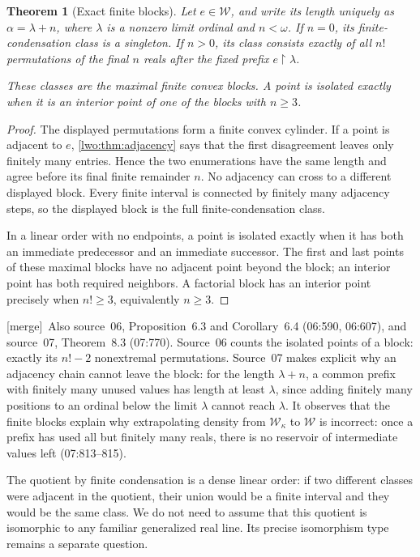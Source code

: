 \documentclass[11pt,a4paper]{article}
\newtheorem{theorem}{Theorem}[section]
\theoremstyle{definition}
\theoremstyle{remark}
\newcommand{\W}{\mathcal W}
\newcommand{\restr}{\mathbin{\upharpoonright}}
\newcommand{\merge}{\textsf{[merge]}}
\begin{document}
\begin{theorem}[Exact finite blocks]\label{lwo:thm:blocks}
Let $e\in\W$, and write its length uniquely as
$\alpha=\lambda+n$, where $\lambda$ is a nonzero limit ordinal and
$n<\omega$. If $n=0$, its finite-condensation class is a singleton. If
$n>0$, its class consists exactly of all $n!$ permutations of the final
$n$ reals after the fixed prefix $e\restr\lambda$.

These classes are the maximal finite convex blocks. A point is isolated
exactly when it is an interior point of one of the blocks with $n\geq3$.
\end{theorem}
\begin{proof}
The displayed permutations form a finite convex cylinder. If a point is
adjacent to $e$, \cref{lwo:thm:adjacency} says that the first disagreement
leaves only finitely many entries. Hence the two enumerations have the same
length and agree before its final finite remainder $n$. No adjacency can
cross to a different displayed block. Every finite interval is connected
by finitely many adjacency steps, so the displayed block is the full
finite-condensation class.

In a linear order with no endpoints, a point is isolated exactly when it
has both an immediate predecessor and an immediate successor. The first
and last points of these maximal blocks have no adjacent point beyond the
block; an interior point has both required neighbors. A factorial block has
an interior point precisely when $n!\geq3$, equivalently $n\geq3$.
\end{proof}
\merge\ Also source~06, Proposition~6.3 and Corollary~6.4 (06:590,
06:607), and source~07, Theorem~8.3 (07:770). Source~06 counts the isolated
points of a block: exactly its $n!-2$ nonextremal permutations. Source~07 makes
explicit why an adjacency chain cannot leave the block: for the length
$\lambda+n$, a common prefix with finitely many unused values has length at
least $\lambda$, since adding finitely many positions to an ordinal below the
limit $\lambda$ cannot reach $\lambda$. It observes that the finite blocks
explain why extrapolating density from $\W_\kappa$ to $\W$ is incorrect: once a
prefix has used all but finitely many reals, there is no reservoir of
intermediate values left (07:813--815).

The quotient by finite condensation is a dense linear order: if two
different classes were adjacent in the quotient, their union would be a
finite interval and they would be the same class. We do not need to assume
that this quotient is isomorphic to any familiar generalized real line.
Its precise isomorphism type remains a separate question.
\end{document}
